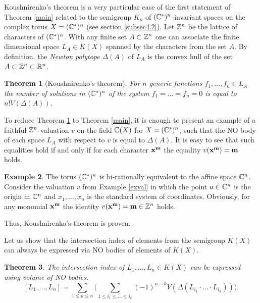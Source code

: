 \documentclass[11pt]{article}
\theoremstyle{plain}
\newtheorem{theorem}{Theorem}[section]
\theoremstyle{definition}
\newtheorem{example}[theorem]{Example}
\begin{document}
Koushnirenko's theorem is a very particular case of the first statement of Theorem \ref{main} related to  the semigroup $K_n$ of $(\Bbb C^*)^n$-invariant spaces on the
  complex torus $X=(\Bbb C^*)^n$ (see section \ref{subsec4.2}). Let $\Bbb Z^n$ be the lattice of  characters of $(\Bbb C^*)^n$.  With any finite set $A\subset \Bbb Z^n$ one can associate the finite dimensional space $L_A\in K(X)$ spanned by the characters from the set $A$.
By definition, the {\it Newton polytope} $\Delta(A)$ of $L_A$ is the convex hull of the set $A\subset \Bbb Z^n \subset \Bbb R^n$.

\begin{theorem}[Koushnirenko's theorem]\label{Ku} For $n$ generic functions $f_1,\dots,f_n\in L_A$ the number of solutions in $(\Bbb C^*)^n$ of the system $f_1=\dots=f_n=0$ is equal to $n! V(\Delta(A))$.
\end{theorem}

To reduce  Theorem \ref{Ku} to Theorem \ref{main}, it is enough to  present an example of a faithful $\Bbb Z^n$-valuation $v$ on the field $\Bbb C(X)$ for $X=(\Bbb C^*)^n$, such that the NO body of each space $L_A$ with respect to $v$ is equal to $\Delta(A)$. It is easy to see that such equalities hold if and only if for each character
$\bold x^{\bold m}$  the equality $v(\bold x^{\bold m})= \bold m $ holds.

\begin{example}\label{exBKK} The torus $(\Bbb C^*)^n$ is bi-rationally  equivalent to the affine space $\Bbb C^n$. Consider the valuation $v$
from Example \ref{exval} in which the point $a\in \Bbb C^n$ is the origin in $\Bbb C^n$ and $x_1,\dots,x_n$ is the standard system of coordinates. Obviously, for any monomial $\bold x^\bold m$ the identity $v(\bold x^\bold m)=\bold m\in \Bbb Z^n$ holds.
\end{example}

Thus, Koushnirenko's theorem is proven.

Let us show that the intersection index of elements from the semigroup $K(X)$ can always  be expressed via NO bodies of elements of $K(X)$.

\begin{theorem}\label{ONBKK} The intersection index of $L_1,\dots,L_n\in K(X)$  can be expressed using  volume of NO bodies:
\begin{equation}\label{ONBKKe} [L_1,\dots, L_n]= \sum _{1\leq k\leq n} \Bigg( \sum _{1\leq i_1\leq \dots \leq  i_k} (-1)^{n-k} V(\Delta (L_{i_1}\cdot \ldots\cdot L_{i_k}))\Bigg).\end{equation}
\end{theorem}
\end{document}
